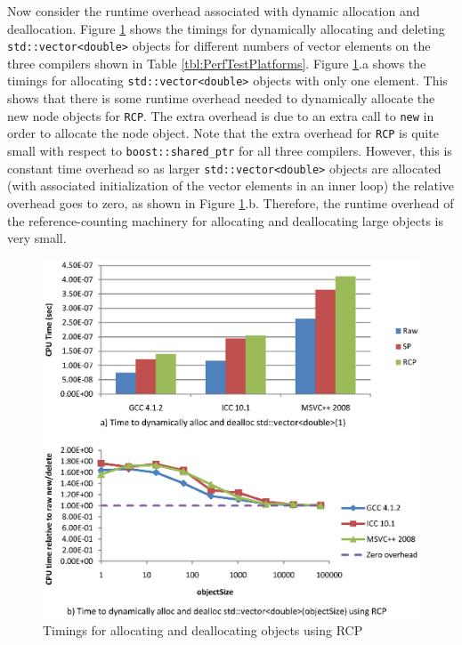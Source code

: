 \documentclass[pdf,ps2pdf,11pt]{SANDreport}
\begin{document}
Now consider the runtime overhead associated with dynamic allocation
and deallocation.  Figure {}\ref{fig:RCPAllocTimings} shows the
timings for dynamically allocating and deleting
{}\texttt{std::vector<double>} objects for different numbers of vector
elements on the three compilers shown in Table
{}\ref{tbl:PerfTestPlatforms}.  Figure {}\ref{fig:RCPAllocTimings}.a
shows the timings for allocating {}\texttt{std::vector<double>}
objects with only one element.  This shows that there is some runtime
overhead needed to dynamically allocate the new node objects for
{}\texttt{RCP}.  The extra overhead is due to an extra call to
{}\texttt{new} in order to allocate the node object.  Note that the
extra overhead for {}\texttt{RCP} is quite small with respect to
{}\texttt{boost::shared\_ptr} for all three compilers.  However, this
is constant time overhead so as larger {}\texttt{std::vector<double>}
objects are allocated (with associated initialization of the vector
elements in an inner loop) the relative overhead goes to zero, as
shown in Figure {}\ref{fig:RCPAllocTimings}.b.  Therefore, the runtime
overhead of the reference-counting machinery for allocating and
deallocating large objects is very small.


{\bsinglespace
\begin{figure}
\begin{center}
\includegraphics*[angle=0,scale=1.00]{RCPAllocTimings}
\end{center}
\caption{
\label{fig:RCPAllocTimings}
Timings for allocating and deallocating objects using RCP}
\end{figure}
\esinglespace}
\end{document}
